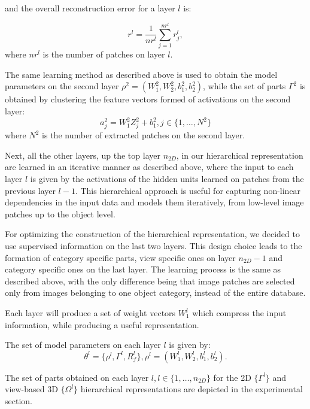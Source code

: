 \documentclass[runningheads]{llncs}
\begin{document}
and the overall reconstruction error for a layer $l$ is:

\begin{equation}
  r^l = \frac{1}{nr^l} \sum_{j=1}^{nr^l} r_j^l,
  \label{eq:r}
\end{equation}
where $nr^l$ is the number of patches on layer $l$.

The same learning method as described above is used to obtain the model parameters on the second layer $\rho^2=(W_1^2,W_2^2,b_1^2,b_2^2)$, while the set of parts $\Gamma^{2}$ is obtained by clustering the feature vectors formed of activations on the second layer:
\begin{equation}
a_j^2=W_1^2Z_j^2+b_1^2, j\in\{1,\ldots,N^2\}
\end{equation}
where $N^2$ is the number of extracted patches on the second layer.

Next, all the other layers, up the top layer $n_{2D}$, in our hierarchical representation are learned in an iterative manner as described above, where the input to each layer $l$ is given by the activations of the hidden units learned on patches from the previous layer $l-1$. This hierarchical approach is useful for capturing non-linear dependencies in the input data and models them iteratively, from low-level image patches up to the object level.

For optimizing the construction of the hierarchical representation, we decided to use supervised information on the last two layers. This design choice leads to the formation of category specific parts, view specific ones on layer $n_{2D}-1$ and category specific ones on the last layer. The learning process is the same as described above, with the only difference being that image patches are selected only from images belonging to one object category, instead of the entire database.    

Each layer will produce a set of weight vectors $W_1^l$ which compress the input information, while producing a useful representation. 

The set of model parameters on each layer $l$ is  given by:
\begin{equation}
\theta^l = \{\rho^l,\Gamma^l,R_f^l\},
\rho^l=(W_1^l,W_2^l,b_1^l,b_2^l).
\end{equation}

The set of parts obtained on each layer $l,l\in\{1,\ldots,n_{2D}\}$ for the 2D $\{\Gamma^l\}$ and view-based 3D $\{\Omega^l\}$ hierarchical representations are depicted in the experimental section.
\end{document}
